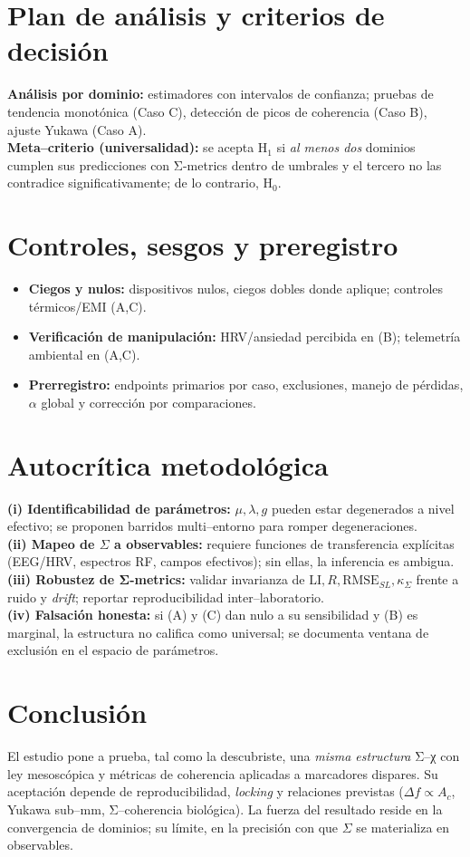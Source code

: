 \documentclass[12pt,a4paper]{article}
\begin{document}
\section{Plan de análisis y criterios de decisión}
\textbf{Análisis por dominio:} estimadores con intervalos de confianza; pruebas de tendencia monotónica (Caso C), detección de picos de coherencia (Caso B), ajuste Yukawa (Caso A). \\
\textbf{Meta–criterio (universalidad):} se acepta H\(_1\) si \emph{al menos dos} dominios cumplen sus predicciones con Σ-metrics dentro de umbrales y el tercero no las contradice significativamente; de lo contrario, H\(_0\).

\section{Controles, sesgos y preregistro}
\begin{itemize}
\item \textbf{Ciegos y nulos:} dispositivos nulos, ciegos dobles donde aplique; controles térmicos/EMI (A,C).
\item \textbf{Verificación de manipulación:} HRV/ansiedad percibida en (B); telemetría ambiental en (A,C).
\item \textbf{Prerregistro:} endpoints primarios por caso, exclusiones, manejo de pérdidas, \(\alpha\) global y corrección por comparaciones.
\end{itemize}

\section{Autocrítica metodológica}
\textbf{(i) Identificabilidad de parámetros:} \(\mu,\lambda,g\) pueden estar degenerados a nivel efectivo; se proponen barridos multi–entorno para romper degeneraciones. \\
\textbf{(ii) Mapeo de \(\Sigma\) a observables:} requiere funciones de transferencia explícitas (EEG/HRV, espectros RF, campos efectivos); sin ellas, la inferencia es ambigua. \\
\textbf{(iii) Robustez de Σ-metrics:} validar invarianza de \(\mathrm{LI},R,\mathrm{RMSE}_{\!SL},\kappa_\Sigma\) frente a ruido y \emph{drift}; reportar reproducibilidad inter–laboratorio. \\
\textbf{(iv) Falsación honesta:} si (A) y (C) dan nulo a su sensibilidad y (B) es marginal, la estructura no califica como universal; se documenta ventana de exclusión en el espacio de parámetros.

\section{Conclusión}
El estudio pone a prueba, tal como la descubriste, una \emph{misma estructura} Σ–χ con ley mesoscópica y métricas de coherencia aplicadas a marcadores dispares. Su aceptación depende de reproducibilidad, \emph{locking} y relaciones previstas (\(\Delta f\propto A_c\), Yukawa sub–mm, Σ–coherencia biológica). La fuerza del resultado reside en la convergencia de dominios; su límite, en la precisión con que \(\Sigma\) se materializa en observables.
\end{document}
